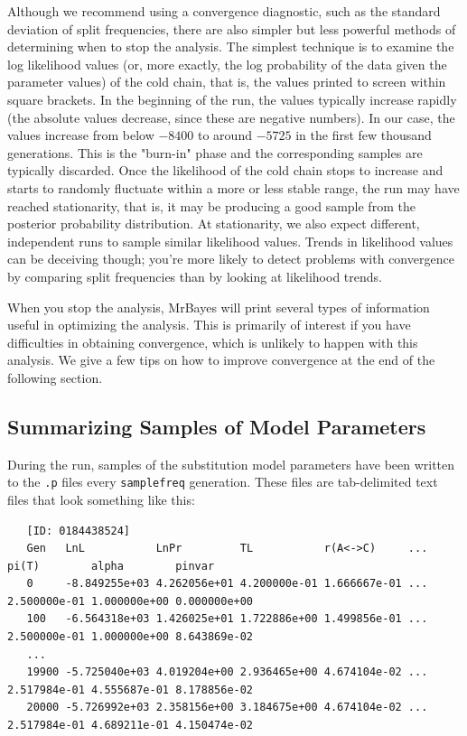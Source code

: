 \documentclass[12pt]{book}
\begin{document}
Although we recommend using a convergence diagnostic, such as the standard deviation of split
frequencies, there are also simpler but less powerful methods of determining when to stop the
analysis. The simplest technique is to examine the log likelihood values (or, more exactly, the log
probability of the data given the parameter values) of the cold chain, that is, the values printed
to screen within square brackets. In the beginning of the run, the values typically increase
rapidly (the absolute values decrease, since these are negative numbers). In our case, the values
increase from below $-8400$ to around $-5725$ in the first few thousand generations. This is the
"burn-in" phase and the corresponding samples are typically discarded.  Once the likelihood of the
cold chain stops to increase and starts to randomly fluctuate within a more or less stable range,
the run may have reached stationarity, that is, it may be producing a good sample from the
posterior probability distribution. At stationarity, we also expect different, independent runs to
sample similar likelihood values. Trends in likelihood values can be deceiving though; you're more
likely to detect problems with convergence by comparing split frequencies than by looking at
likelihood trends.

When you stop the analysis, MrBayes will print several types of information useful in optimizing
the analysis. This is primarily of interest if you have difficulties in obtaining convergence,
which is unlikely to happen with this analysis. We give a few tips on how to improve convergence at
the end of the following section.

\subsection{Summarizing Samples of Model Parameters}

During the run, samples of the substitution model parameters have been written to the \texttt{.p}
files every \texttt{samplefreq} generation. These files are tab-delimited text files that look
something like this: 

\begin{singlespacing}
\small
\begin{verbatim}
   [ID: 0184438524]
   Gen   LnL           LnPr         TL           r(A<->C)     ... pi(T)        alpha        pinvar
   0     -8.849255e+03 4.262056e+01 4.200000e-01 1.666667e-01 ... 2.500000e-01 1.000000e+00 0.000000e+00
   100   -6.564318e+03 1.426025e+01 1.722886e+00 1.499856e-01 ... 2.500000e-01 1.000000e+00 8.643869e-02
   ...
   19900 -5.725040e+03 4.019204e+00 2.936465e+00 4.674104e-02 ... 2.517984e-01 4.555687e-01 8.178856e-02
   20000 -5.726992e+03 2.358156e+00 3.184675e+00 4.674104e-02 ... 2.517984e-01 4.689211e-01 4.150474e-02
\end{verbatim}
\normalsize
\end{singlespacing}
\end{document}
